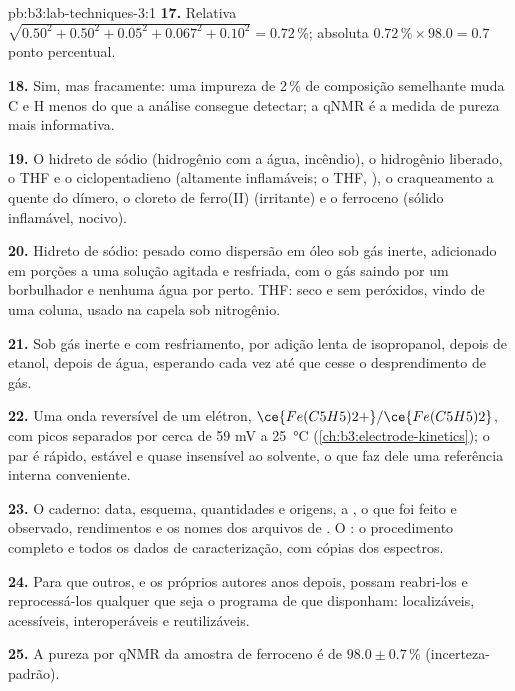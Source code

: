 \begin{solution}{pb:b3:lab-techniques-3:1}
\textbf{17.} Relativa $\sqrt{0.50^2 + 0.50^2 + 0.05^2 + 0.067^2 + 0.10^2} = 0.72$\,\%; absoluta $0.72\,\% \times 98.0 = 0.7$ ponto percentual.

\textbf{18.} Sim, mas fracamente: uma impureza de 2\,\% de composição semelhante muda C e H menos
do que a análise consegue detectar; a qNMR é a medida de pureza mais informativa.

\textbf{19.} O hidreto de sódio (hidrogênio com a água, incêndio), o hidrogênio liberado, o THF e o
ciclopentadieno (altamente inflamáveis; o THF, ), o craqueamento a quente do
dímero, o cloreto de ferro(II) (irritante) e o ferroceno (sólido inflamável, nocivo).

\textbf{20.} Hidreto de sódio: pesado como dispersão em óleo sob gás inerte, adicionado em
porções a uma solução agitada e resfriada, com o gás saindo por um borbulhador e nenhuma água
por perto. THF: seco e sem peróxidos, vindo de uma coluna, usado na capela sob nitrogênio.

\textbf{21.} Sob gás inerte e com resfriamento, por adição lenta de isopropanol, depois de
etanol, depois de água, esperando cada vez até que cesse o desprendimento de gás.

\textbf{22.} Uma onda reversível de um elétron, $\ce{Fe(C5H5)2+}/\ce{Fe(C5H5)2}$, com picos separados por cerca de 59 mV a \qty{25}{\celsius}
(\cref{ch:b3:electrode-kinetics}); o par é rápido, estável e quase insensível ao
solvente, o que faz dele uma referência interna conveniente.

\textbf{23.} O caderno: data, esquema, quantidades e origens, a , o que
foi feito e observado, rendimentos e os nomes dos arquivos de . O : o procedimento completo e todos os dados de caracterização, com cópias dos
espectros.

\textbf{24.} Para que outros, e os próprios autores anos depois, possam reabri-los e reprocessá-los
qualquer que seja o programa de que disponham: localizáveis, acessíveis, interoperáveis e reutilizáveis.

\textbf{25.} A pureza por qNMR da amostra de ferroceno é de $98.0 \pm 0.7$\,\% (incerteza-padrão).
\end{solution}
